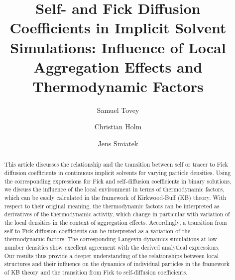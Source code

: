 \documentclass[aip,jcp,reprint]{revtex4-1}
\begin{document}
\title{Self- and Fick Diffusion Coefficients in Implicit Solvent Simulations: Influence of Local Aggregation Effects and Thermodynamic Factors}
\author{Samuel Tovey}
\author{Christian Holm}
\author{Jens Smiatek}

\begin{abstract}
This article discusses the relationship and the transition between self or tracer to Fick diffusion coefficients in continuous implicit solvents for varying particle densities.
Using the corresponding expressions for Fick and self-diffusion coefficients in binary solutions, we discuss the influence of the local environment in terms of thermodynamic factors, which can be easily calculated in the framework of Kirkwood-Buff (KB) theory. With respect to their original meaning, the thermodynamic factors can be interpreted as derivatives of the thermodynamic activity, which change in particular with variation of the local densities in the context of aggregation effects. Accordingly, a transition from self to Fick diffusion coefficients can be interpreted as a variation of the thermodynamic factors.
The corresponding Langevin dynamics simulations at low number densities show excellent agreement with the derived analytical expressions.
Our results thus provide a deeper understanding of the relationships between local structures and their influence on the dynamics of individual particles in the framework of KB theory and the transition from Fick to self-diffusion coefficients.
\end{abstract}

\maketitle


\end{document}
